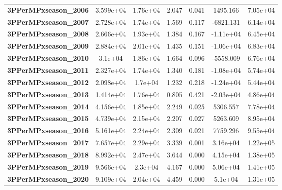 \begin{center}
\begin{tabular}{lcccccc}
\textbf{3PPerMPxseason\_2006} &    3.599e+04  &     1.76e+04     &     2.047  &         0.041        &     1495.166    &     7.05e+04     \\
\textbf{3PPerMPxseason\_2007} &    2.728e+04  &     1.74e+04     &     1.569  &         0.117        &    -6821.131    &     6.14e+04     \\
\textbf{3PPerMPxseason\_2008} &    2.666e+04  &     1.93e+04     &     1.384  &         0.167        &    -1.11e+04    &     6.45e+04     \\
\textbf{3PPerMPxseason\_2009} &    2.884e+04  &     2.01e+04     &     1.435  &         0.151        &    -1.06e+04    &     6.83e+04     \\
\textbf{3PPerMPxseason\_2010} &      3.1e+04  &     1.86e+04     &     1.664  &         0.096        &    -5558.009    &     6.76e+04     \\
\textbf{3PPerMPxseason\_2011} &    2.327e+04  &     1.74e+04     &     1.340  &         0.181        &    -1.08e+04    &     5.74e+04     \\
\textbf{3PPerMPxseason\_2012} &    2.098e+04  &      1.7e+04     &     1.232  &         0.218        &    -1.24e+04    &     5.44e+04     \\
\textbf{3PPerMPxseason\_2013} &    1.414e+04  &     1.76e+04     &     0.805  &         0.421        &    -2.03e+04    &     4.86e+04     \\
\textbf{3PPerMPxseason\_2014} &    4.156e+04  &     1.85e+04     &     2.249  &         0.025        &     5306.557    &     7.78e+04     \\
\textbf{3PPerMPxseason\_2015} &    4.739e+04  &     2.15e+04     &     2.207  &         0.027        &     5263.609    &     8.95e+04     \\
\textbf{3PPerMPxseason\_2016} &    5.161e+04  &     2.24e+04     &     2.309  &         0.021        &     7759.296    &     9.55e+04     \\
\textbf{3PPerMPxseason\_2017} &    7.657e+04  &     2.29e+04     &     3.339  &         0.001        &     3.16e+04    &     1.22e+05     \\
\textbf{3PPerMPxseason\_2018} &    8.992e+04  &     2.47e+04     &     3.644  &         0.000        &     4.15e+04    &     1.38e+05     \\
\textbf{3PPerMPxseason\_2019} &    9.566e+04  &      2.3e+04     &     4.167  &         0.000        &     5.06e+04    &     1.41e+05     \\
\textbf{3PPerMPxseason\_2020} &    9.109e+04  &     2.04e+04     &     4.459  &         0.000        &      5.1e+04    &     1.31e+05     \\

\end{tabular}
\end{center}
